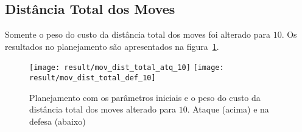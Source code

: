 \subsection{Distância Total dos Moves}
Somente o peso do custo da distância total dos moves foi
alterado para $10$. Os resultados no planejamento são
apresentados na figura~\ref{fig:mov_dist_total_10}.

\begin{figure}[H]
  \centering
  \texttt{[image: result/mov\_dist\_total\_atq\_10]}
  \texttt{[image: result/mov\_dist\_total\_def\_10]}
  \caption{Planejamento com os parâmetros iniciais e o peso do
           custo da distância total dos moves alterado para $10$.
           Ataque (acima) e na defesa (abaixo)}\label{fig:mov_dist_total_10}
\end{figure}
